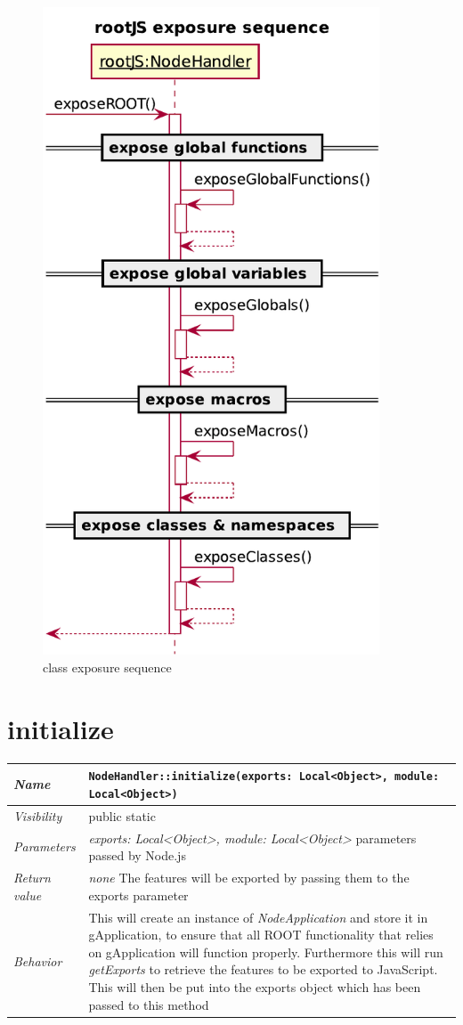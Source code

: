 \begin{figure}[H]
	\centering
	\includegraphics[width=10cm]{./latex/resources/exposureSequence.pdf}
	\caption{class exposure sequence}
\end{figure} \pagebreak
\section{initialize}
\begin{longtable}{p{3cm} @{\hskip 1cm} p{12cm}}
 \hline
\textit{Name} & \texttt{NodeHandler::initialize(exports: Local<Object>, module: Local<Object>)}\\
\hline
 \textit{Visibility} & public static\\
\hline
\textit{Parameters} & \textit{exports: Local<Object>, module: Local<Object>} parameters passed by Node.js\\
\hline
\textit{Return value} & \textit{none} The features will be exported by passing them to the exports parameter \\
  \hline
 \textit{Behavior} & This will create an instance of \textit{NodeApplication} and store it in gApplication, to ensure that all ROOT functionality that relies on gApplication will function properly.
 Furthermore this will run \textit{getExports} to retrieve the features to be exported to JavaScript. This will then be put into the exports object which has been passed to this method \\
\hline
\end{longtable}
